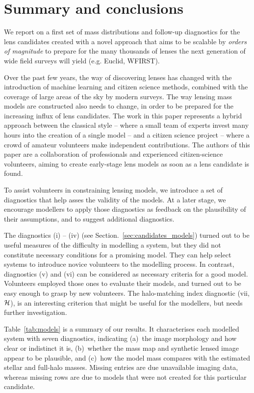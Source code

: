 
\section{Summary and conclusions}\label{sec:summary}


We report on a first set of mass distributions and follow-up
diagnostics for the {\SW} lens candidates created with a novel
approach that aims to be scalable by {\sl orders of magnitude} to
prepare for the many thousands of lenses the next generation of wide
field surveys will yield (e.g. Euclid, WFIRST).

Over the past few years, the way of discovering lenses has changed
with the introduction of machine learning and citizen science methods,
combined with the coverage of large areas of the sky by modern
surveys.  The way lensing mass models are constructed also needs to
change, in order to be prepared for the increasing influx of lens
candidates.  The work in this paper represents a hybrid approach
between the classical style -- where a small team of experts invest
many hours into the creation of a single model -- and a citizen
science project -- where a crowd of amateur volunteers make
independent contributions.  The authors of this paper are a
collaboration of professionals and experienced citizen-science
volunteers, aiming to create early-stage lens models as soon as a lens
candidate is found.

To assist volunteers in constraining lensing models, we introduce a
set of diagnostics that help asses the validity of the models. At a
later stage, we encourage modellers to apply those diagnostics as
feedback on the plausibility of their assumptions, and to suggest
additional diagnostics.

The diagnostics (i) -- (iv) (see Section.~\ref{sec:candidates_models})
turned out to be useful measures of the difficulty in modelling a
system, but they did not constitute necessary conditions for a
promising model.  They can help select systems to introduce novice
volunteers to the modelling process. In contrast, diagnostics (v) and
(vi) can be considered as necessary criteria for a good model.
Volunteers employed those ones to evaluate their models, and turned out
to be easy enough to grasp by new volunteers.  The halo-matching
index diagnostic (vii, $\mathcal{H}$), is an interesting criterion that
might be useful for the modellers, but needs further investigation.


Table~\ref{tab:models} is a summary of our results.  It characterises
each modelled system with seven diagnostics, indicating (a)~the image
morphology and how clear or indistinct it is, (b)~whether the mass map
and synthetic lensed image appear to be plausible, and (c)~how the
model mass compares with the estimated stellar and full-halo masses.
Missing entries are due unavailable imaging data, whereas 
missing rows are due to models that were not created for this particular
candidate.


